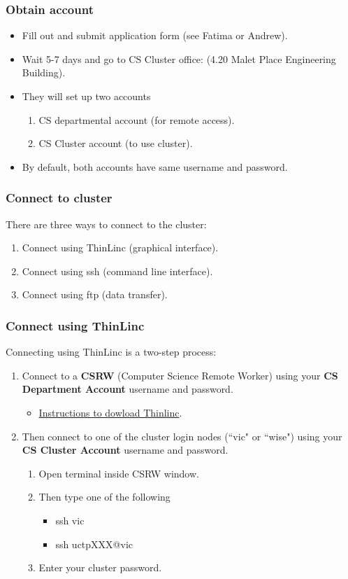 \documentclass{beamer}
\begin{document}
\begin{frame}
\frametitle{Obtain account}
\begin{itemize}
\item Fill out and submit application form (see Fatima or Andrew).
\item Wait 5-7 days and go to CS Cluster office: (4.20 Malet Place Engineering Building).
\item They will set up two accounts
\begin{enumerate}
\item CS departmental account (for remote access).
\item CS Cluster account (to use cluster).
\end{enumerate}
\item By default, both accounts have same username and password.
\end{itemize}
\end{frame}

\begin{frame}
\frametitle{Connect to cluster}

There are three ways to connect to the cluster:
\begin{enumerate}
\item Connect using ThinLinc (graphical interface).
\item Connect using ssh (command line interface).
\item Connect using ftp (data transfer).
\end{enumerate}
\end{frame}

\begin{frame}
\frametitle{Connect using ThinLinc}

Connecting using ThinLinc is a two-step process:
\begin{enumerate}
\item Connect to a \textbf{CSRW} (Computer Science Remote Worker) using your \textbf{CS Department Account} username and password.
\begin{itemize}
\item \textcolor{blue}{\href{http://www.cs.ucl.ac.uk/index.php?id=7404}{Instructions to dowload Thinlinc}}.
\end{itemize}
\item Then connect to one of the cluster login nodes (``vic" or ``wise") using your \textbf{CS Cluster Account} username and password.
\begin{enumerate}
\item Open terminal inside CSRW window. 
\item Then type one of the following
\begin{itemize}
\item ssh vic
\item ssh uctpXXX@vic
\end{itemize}
\item Enter your cluster password.
\end{enumerate}
\end{enumerate}
\end{frame}
\end{document}
